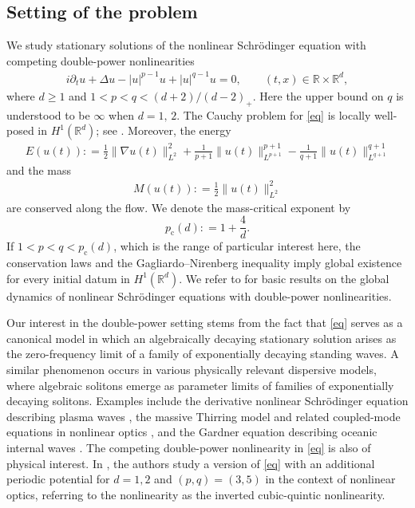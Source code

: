 \documentclass[12pt, a4paper, reqno]{amsart}
\numberwithin{equation}{section}
\theoremstyle{definition}
\theoremstyle{remark}
\newcommand{\R}{\mathbb R}
\newcommand{\pt}{\partial}
\newcommand{\ce}{\mathrel{\mathop:}=}
\begin{document}
\subsection{Setting of the problem}
We study stationary solutions of the nonlinear Schr\"odinger equation with
competing double-power nonlinearities
\begin{align}
\label{eq}
i\pt_t u+\Delta u-|u|^{p-1}u+|u|^{q-1}u=0,
\qquad (t,x)\in\R\times\R^d,
\end{align}
where $d\ge1$ and $1<p<q<(d+2)/(d-2)_+$. Here the upper bound on $q$ is
understood to be $\infty$ when $d=1,\,2$. 
The Cauchy problem
for \eqref{eq} is locally well-posed in
$H^1(\R^d)$; see \cite[Chapter~4]{C03}.
Moreover, the energy
\begin{align*}
  E(u(t))
  \ce\frac12\|\nabla u(t)\|_{L^2}^2
  +\frac{1}{p+1}\|u(t)\|_{L^{p+1}}^{p+1}
  -\frac{1}{q+1}\|u(t)\|_{L^{q+1}}^{q+1}
\end{align*}
and the mass
\begin{align*}
M(u(t))\ce\frac12\|u(t)\|_{L^2}^2
\end{align*}
are conserved along the flow. 
We denote the mass-critical exponent by
\[
  p_{\mathrm c}(d)\ce1+\frac4d.
\]
If $1<p<q<p_{\mathrm c}(d)$, which is the range of particular interest
here, the conservation laws and the Gagliardo--Nirenberg inequality
imply global existence for every initial datum in $H^1(\R^d)$.
We refer to \cite{TVZ07} for basic results on the global dynamics of
nonlinear Schr\"odinger equations with double-power nonlinearities.

Our interest in the double-power setting stems from the fact that
\eqref{eq} serves as a canonical model in which an algebraically decaying
stationary solution arises as the zero-frequency limit of a family of
exponentially decaying standing waves.
A similar phenomenon occurs in various physically relevant dispersive
models, where algebraic solitons emerge as parameter limits of families
of exponentially decaying solitons.
Examples include the derivative nonlinear Schr\"odinger equation
describing plasma waves \cite{KN78}, the massive Thirring model and
related coupled-mode equations in nonlinear optics \cite{BPZ98,HHP24},
and the Gardner equation describing oceanic internal waves
\cite{GPT99,HMHS11}. The competing double-power nonlinearity in \eqref{eq} is also of physical interest. In \cite{ZMMZ25}, the authors study a version of \eqref{eq} with an additional periodic potential for $d=1,2$ and $(p,q)=(3,5)$ in the context of nonlinear optics, referring to the nonlinearity as the inverted cubic-quintic nonlinearity.
\end{document}
